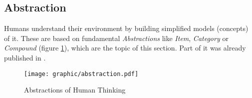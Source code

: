 %
%
%
%
%
%
%

\subsection{Abstraction}
\label{abstraction_heading}

Humans understand their environment by building simplified models (concepts) of
it. These are based on fundamental \emph{Abstractions} like \emph{Item},
\emph{Category} or \emph{Compound} (figure \ref{abstraction_figure}), which are
the topic of this section. Part of it was already published in \cite{heller2004}.

\begin{figure}[ht]
    \begin{center}
        \texttt{[image: graphic/abstraction.pdf]}
        \caption{Abstractions of Human Thinking}
        \label{abstraction_figure}
    \end{center}
\end{figure}




